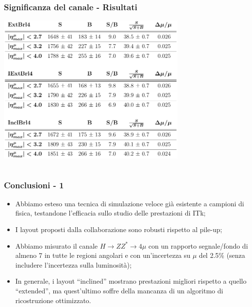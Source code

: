 \documentclass{beamer}
\begin{document}

\begin{frame}
\frametitle{Significanza del canale - Risultati}
\centering
\includegraphics[width=.9\textwidth, height=7.5cm]{significance}
\end{frame}


\section{}
\begin{frame}
\frametitle{Conclusioni - 1}
\begin{itemize}
\item<1-> Abbiamo esteso una tecnica di simulazione veloce gi\`a esistente
a campioni di fisica, testandone l'efficacia sullo studio delle prestazioni di ITk;
\item<2-> I layout proposti dalla collaborazione sono robusti rispetto al pile-up;
\item<3-> Abbiamo misurato il canale $H \rightarrow ZZ^{*} \rightarrow 4\mu$ con
un rapporto segnale/fondo di almeno 7 in tutte le regioni angolari e con un'incertezza
su $\mu$ del 2.5\% (senza includere l'incertezza sulla luminosit\`a);
\item<4-> In generale, i layout ``inclined'' mostrano prestazioni migliori rispetto a quello
``extended'', ma quest'ultimo soffre della mancanza di un algoritmo di ricostruzione ottimizzato.
\end{itemize}
\end{frame}
\end{document}
